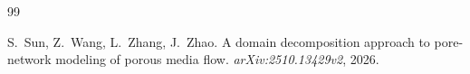 \documentclass[11pt,a4paper]{article}
\begin{document}
\begin{thebibliography}{99}

S.~Sun, Z.~Wang, L.~Zhang, J.~Zhao.
\newblock A domain decomposition approach to pore-network modeling of porous
  media flow.
\newblock \textit{arXiv:2510.13429v2}, 2026.

\end{thebibliography}
\end{document}

